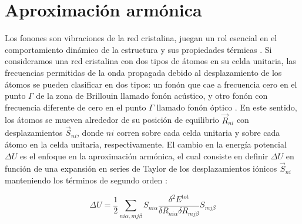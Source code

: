 



\section{Aproximación armónica}

Los fonones son vibraciones de la red cristalina, juegan un rol esencial en el comportamiento dinámico de la estructura y sus propiedades térmicas \cite{Togo2015phonopy}. Si consideramos una red cristalina con dos tipos de átomos en su celda unitaria, las frecuencias permitidas de la onda propagada debido al desplazamiento de los átomos se pueden clasificar en dos tipos: un fonón que cae a frecuencia cero en el punto $\Gamma$ de la zona de Brillouin llamado fonón acústico, y otro fonón con frecuencia diferente de cero en el punto $\Gamma$ llamado fonón óptico \cite{Hamid2018Solids}. En este sentido, los átomos se mueven alrededor de su posición de equilibrio $\vec{R}_{ni}$ con desplazamientos $\vec{S}_{ni}$, donde $ni$ corren sobre cada celda unitaria y sobre cada átomo en la celda unitaria, respectivamente. El cambio en la energía potencial $\Delta U$ es el enfoque en la aproximación armónica, el cual consiste en definir $\Delta U$ en función de una expansión en series de Taylor de los desplazamientos iónicos $\vec{S}_{ni}$ manteniendo los términos de segundo orden \cite{kaxirasjoannopoulos2019}:

\begin{equation}
    \Delta U =\frac{1}{2}\sum_{ni\alpha,mj\beta}S_{ni\alpha}\frac{\delta^{2}E^{\text{tot}}}{\delta R_{ni\alpha}\delta R_{mj\beta}}S_{mj\beta}
\end{equation}

